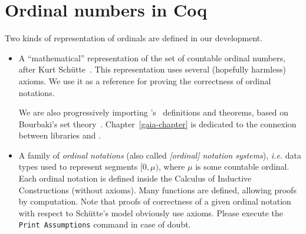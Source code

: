 \section{Ordinal numbers in Coq}

Two kinds of representation of ordinals are defined in our development.

\begin{itemize}
\item A ``mathematical'' representation of the set of countable ordinal numbers, after Kurt Schütte~\cite{schutte}. This representation uses several (hopefully harmless) axioms. We use it as a reference for proving the correctness of ordinal notations.

  \gaiasign
  We are also progressively importing \gaia's~\cite{Gaia} definitions and theorems, based on Bourbaki's set theory~\cite{Grimm2016}. Chapter~\ref{gaia-chapter} is dedicated to the connexion between libraries \HydrasLib and \gaia.
  
\item A family of \emph{ordinal notations} (also called \emph{[ordinal] notation systems}), \emph{i.e.} data types used to represent segments $[0,\mu)$, where $\mu$ is some countable ordinal. Each ordinal notation is defined inside the Calculus of Inductive Constructions (without axioms). Many functions are defined, allowing proofs by computation. Note that proofs of 
correctness of a given ordinal notation with respect to Schütte's model obviously use axioms.
Please execute the \texttt{Print Assumptions} command in case of doubt.
\end{itemize}




